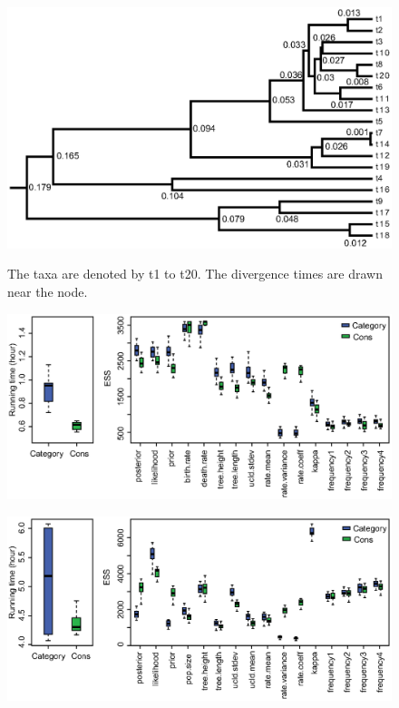 \documentclass{bmcart}
\begin{document}
\begin{backmatter}
\begin{figure}[h!]
\includegraphics[width=12cm]{simulateddatatree.eps}\\
\caption{
             The taxa are denoted by t1 to t20. The divergence times are drawn near the node.}
\label{simulateddatatree}
\end{figure}

\begin{figure}[h!]
\includegraphics[width=12cm]{AnolisTimeEss.eps}\\
\caption{}
\label{anolistimeess}
\end{figure}

\begin{figure}[h!]
\includegraphics[width=12cm]{RSV2TimeEss.eps}\\
\caption{}
\label{rsv2timeess}
\end{figure}


\end{backmatter}
\end{document}
